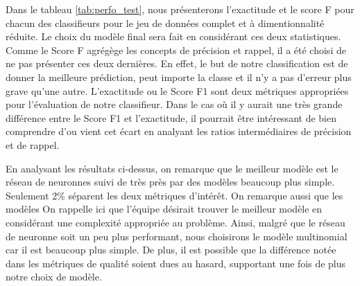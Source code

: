 Dans le tableau \ref{tab:perfo_test}, nous présenterons l'exactitude et le score F pour chacun des classifieurs pour le jeu de données complet et à dimentionnalité réduite. Le choix du modèle final sera fait en considérant ces deux statistiques. \\

Comme le Score F agrégège les concepts de précision et rappel, il a été choisi de ne pas présenter ces deux dernières. En effet, le but de notre classification est de donner la meilleure prédiction, peut importe la classe et il n'y a pas d'erreur plus grave qu'une autre. L'exactitude ou le Score F1 sont deux métriques appropriées pour l'évaluation de notre classifieur. Dans le cas où il y aurait une très grande différence entre le Score F1 et l'exactitude, il pourrait être intéressant de bien comprendre d'ou vient cet écart en analyant les ratios intermédiaires de précision et de rappel.

\begin{table}[H]
	
	\caption{\label{tab:perfo_test}Performances des différents modèles sur le jeu de données de test selon les différentes mesures de performance.}
	\centering
\end{table}

En analysant les résultats ci-dessus, on remarque que le meilleur modèle est le réseau de neuronnes suivi de très près par des modèles beaucoup plus simple. Seulement 2\% séparent les deux métriques d'intérêt. On remarque aussi que les modèles  On rappelle ici que l'équipe désirait trouver le meilleur modèle en considérant une complexité appropriée au problème. Ainsi, malgré que le réseau de neuronne soit un peu plus performant, nous choisirons le modèle multinomial car il est beaucoup plus simple. De plus, il est possible que la différence notée dans les métriques de qualité soient dues au hasard, supportant une fois de plus notre choix de modèle. 
 
